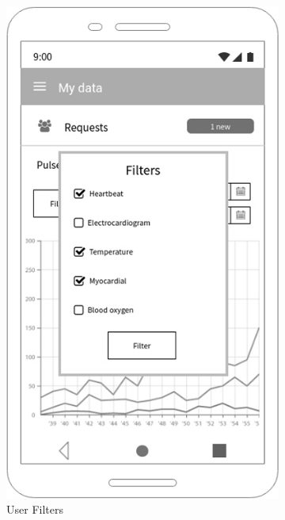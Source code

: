 \begin{figure}[h!]
 \centering
  \begin{subfigure}[b]{0.4\linewidth}
    \includegraphics[width=\linewidth]{img/mockup/u_filters.jpg}
    \caption{User Filters}
  \end{subfigure}
 ~ ~ ~ ~ ~ ~ 
  \begin{subfigure}[b]{0.4\linewidth}

\end{subfigure}
\end{figure}
